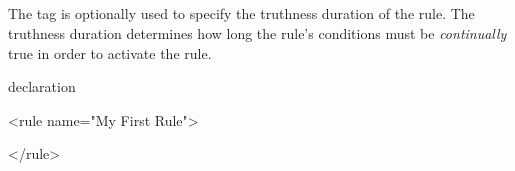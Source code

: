 
\subsection{}

The  tag is optionally used to specify the truthness
duration of the rule.  The truthness duration determines how long
the rule's conditions must be \emph{continually} true in order
to activate the rule.

\begin{tagDesc}{declaration}
\attrs
\end{tagDesc}

\begin{center}
\begin{minipage}{0.8\textwidth}
\begin{tagExample}
<rule name="My First Rule">

    \color{black}{<duration hours="2"}
              \color{black}{minutes="30"/>}

</rule>
\end{tagExample}
\end{minipage}
\end{center}
